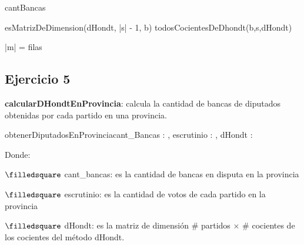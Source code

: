 \documentclass[10pt,a4paper]{article}
\begin{document}
\vspace{0.3cm}
{cantBancas }

\vspace{0.3cm}
{}

\vspace{0.3cm}
{
	esMatrizDeDimension(dHondt, |s| - 1, b) \yLuego todosCocientesDeDhondt(b,s,dHondt)
}

\vspace{0.3cm}
{|m| = filas \wedge {}}

\vspace{0.3cm}
{}

\pagebreak






\subsection{Ejercicio 5} 

\textbf{calcularDHondtEnProvincia}: calcula la cantidad de bancas de diputados obtenidas por cada partido en una
provincia.

\begin{proc}{obtenerDiputadosEnProvincia}{\In cant\_Bancas : \ent, \In escrutinio : \TLista{\ent}, \In dHondt : \TLista{\TLista{\ent}}}{\TLista{\ent}}
\end{proc}

Donde:

\quad $\filledsquare$ cant\_bancas: es la cantidad de bancas en disputa en la provincia

\quad $\filledsquare$ escrutinio: es la cantidad de votos de cada partido en la provincia

\quad $\filledsquare$ dHondt: es la matriz de dimensión $\#$ partidos $\times$ $\#$ cocientes de los cocientes del método dHondt.
\end{document}
